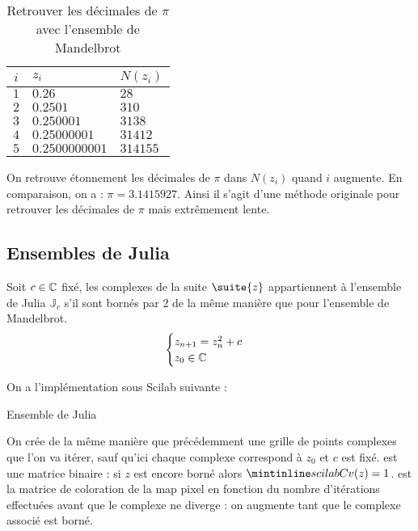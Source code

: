 			\begin{table}[H]
				\centering
				\begin{tabular}{|c|l|l|}
					\hline
					$i$	& $z_i$				& $N(z_i)$	\\	\hline
					\hline
					$1$	& $0.26$			& $28$		\\	\hline
					$2$	& $0.2501$			& $310$		\\	\hline
					$3$	& $0.250001$		& $3138$	\\	\hline
					$4$	& $0.25000001$		& $31412$	\\	\hline
					$5$	& $0.2500000001$	& $314155$	\\	\hline
				\end{tabular}
				\caption{Retrouver les décimales de $\pi$ avec l'ensemble de Mandelbrot}
				\label{tb-2-piMandelbrot}
			\end{table}

			On retrouve étonnement les décimales de $\pi$ dans $N(z_i)$ quand $i$ augmente. En comparaison, on a : $\pi = 3.1415927$.
			Ainsi il s'agit d'une méthode originale pour retrouver les décimales de $\pi$ mais extrêmement lente.

	\subsection{Ensembles de Julia}

		Soit $c\in\mathbb{C}$ fixé, les complexes de la suite $\suite{z}$ appartiennent à l'ensemble de Julia $\mathbb{J}_c$ s'il sont bornés par 2 de la même manière que pour l'ensemble de Mandelbrot.
		\begin{equation}
			\label{eq-2-julia}
			\begin{cases}
				z_{n+1} = z_n^2 + c			\\
				z_0 \in \mathbb{C}
			\end{cases}
		\end{equation}	

		On a l'implémentation sous Scilab suivante :
		\begin{listing}[H]
			\caption{Ensemble de Julia}
			\label{code-2-julia}
		\end{listing}		

		On crée de la même manière que précédemment une grille de points complexes que l'on va itérer, sauf qu'ici chaque complexe correspond à $z_0$ et $c$ est fixé.
		 est une matrice binaire : si $z$ est encore borné alors $\code{Cv(z)} = 1$.
		 est la matrice de coloration de la map pixel en fonction du nombre d'itérations effectuées avant que le complexe ne diverge : on augmente  tant que le complexe associé est borné.

